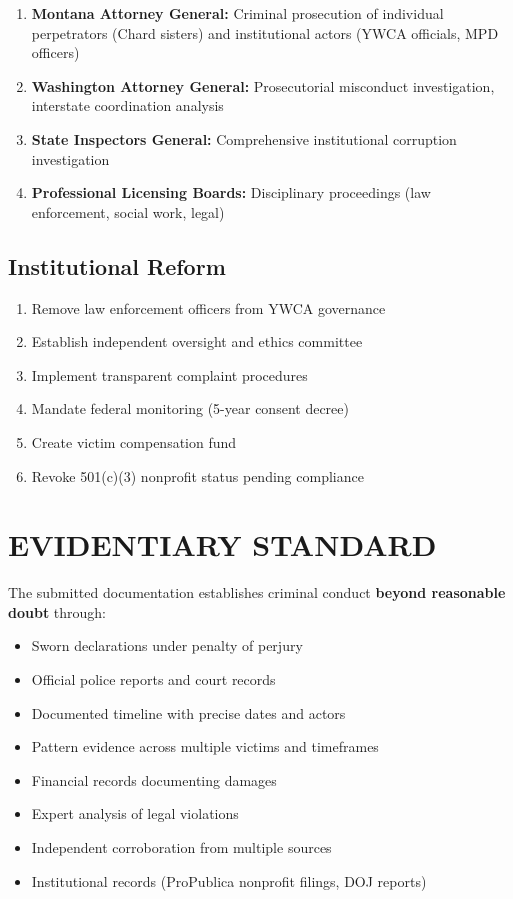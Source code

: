 \documentclass[12pt,oneside]{article}
\begin{document}
\begin{enumerate}
\item \textbf{Montana Attorney General:} Criminal prosecution of individual perpetrators (Chard sisters) and institutional actors (YWCA officials, MPD officers)
\item \textbf{Washington Attorney General:} Prosecutorial misconduct investigation, interstate coordination analysis
\item \textbf{State Inspectors General:} Comprehensive institutional corruption investigation
\item \textbf{Professional Licensing Boards:} Disciplinary proceedings (law enforcement, social work, legal)
\end{enumerate}

\subsection*{Institutional Reform}

\begin{enumerate}
\item Remove law enforcement officers from YWCA governance
\item Establish independent oversight and ethics committee
\item Implement transparent complaint procedures
\item Mandate federal monitoring (5-year consent decree)
\item Create victim compensation fund
\item Revoke 501(c)(3) nonprofit status pending compliance
\end{enumerate}

\section*{EVIDENTIARY STANDARD}

The submitted documentation establishes criminal conduct \textbf{beyond reasonable doubt} through:

\begin{itemize}
\item Sworn declarations under penalty of perjury
\item Official police reports and court records
\item Documented timeline with precise dates and actors
\item Pattern evidence across multiple victims and timeframes
\item Financial records documenting damages
\item Expert analysis of legal violations
\item Independent corroboration from multiple sources
\item Institutional records (ProPublica nonprofit filings, DOJ reports)
\end{itemize}
\end{document}
